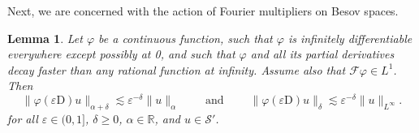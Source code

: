 \documentclass[a4paper,11pt]{article}
\newcommand{\mathD}{\mathrm{D}}
\newcommand{\tmop}[1]{\ensuremath{\operatorname{#1}}}
\newtheorem{lemma}[theorem]{Lemma}
\theoremstyle{remark}
\newcommand{\CF}{\ensuremath{\mathscr{F}}}
\newcommand{\CS}{\ensuremath{\mathscr{S}}}
\begin{document}
Next, we are concerned with the action of Fourier multipliers on Besov spaces.

\begin{lemma}\label{lemma:fourier multiplier smoothing}
  Let $\varphi$ be a continuous function, such that $\varphi$ is infinitely differentiable everywhere except possibly at 0, and such that $\varphi$ and all its partial derivatives decay faster than any rational function at infinity. Assume also that $\CF \varphi \in L^{1}$. Then
  \[
     \| \varphi ( \varepsilon \mathD ) u \|_{\alpha + \delta} \lesssim \varepsilon^{- \delta} \| u \|_{\alpha} \hspace{2em} \tmop{and} \hspace{2em} \| \varphi ( \varepsilon \mathD ) u \|_{\delta}  \lesssim \varepsilon^{- \delta} \| u \|_{L^{\infty}} .
  \]
  for all $\varepsilon \in (0,1]$, $\delta \geqslant 0$, $\alpha \in \mathbb{R}$, and $u \in \CS'$.
\end{lemma}
\end{document}
